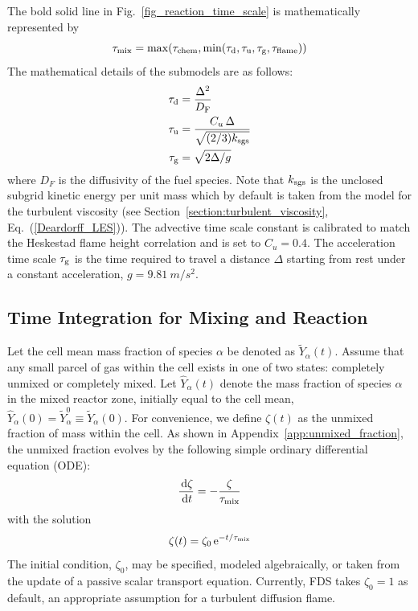 The bold solid line in Fig.~\ref{fig_reaction_time_scale} is mathematically represented by
\begin{equation}
\label{eqn_tau_mix}
\tau_{\rm mix} = \max(\tau_{\rm chem},\min(\tau_{\rm d},\tau_{\rm u},\tau_{\rm g},\tau_{\rm flame}))
\end{equation}
The mathematical details of the submodels are as follows:
\begin{align}
\label{eq:tau_diff} \tau_{\rm d} &= \frac{\Delta^2}{D_{\si{F}}} \\
\label{eq:tau_sgs}  \tau_{\rm u} &= \frac{C_u \,\Delta}{\sqrt{(2/3)k_{\rm sgs}}} \\
\label{eqn_tau_grav}\tau_{\rm g} &= \sqrt{ 2\Delta/g }
\end{align}
where $D_{\si{F}}$ is the diffusivity of the fuel species. Note that $k_{\rm sgs}$ is the unclosed subgrid kinetic energy per unit mass which by default is taken from the model for the turbulent viscosity (see Section~\ref{section:turbulent_viscosity}, Eq.~(\ref{Deardorff_LES})).  The advective time scale constant is calibrated to match the Heskestad flame height correlation \cite{FDS_Validation_Guide} and is set to $C_u = 0.4$. The acceleration time scale $\tau_{\rm g}$ is the time required to travel a distance $\Delta$ starting from rest under a constant acceleration, $g=\SI{9.81}{m/s^2}$.



\subsection{Time Integration for Mixing and Reaction}
\label{sec:subgrid_evironment}

Let the cell mean mass fraction of species $\alpha$ be denoted as $\widetilde{Y}_\alpha(t)$. Assume that any small parcel of gas within the cell exists in one of two states: completely unmixed or completely mixed.  Let $\hat{Y}_\alpha(t)$ denote the mass fraction of species $\alpha$ in the mixed reactor zone, initially equal to the cell mean, $\hat{Y}_\alpha(0) = \widetilde{Y}_{\alpha}^0 \equiv \widetilde{Y}_{\alpha}(0)$. For convenience, we define $\zeta(t)$ as the unmixed fraction of mass within the cell. As shown in Appendix~\ref{app:unmixed_fraction}, the unmixed fraction evolves by the following simple ordinary differential equation (ODE):
\begin{equation}
\label{eq:zeta}
\frac{\,\mathrm{d} \zeta}{\,\mathrm{d} t}=-\frac{\zeta}{\tau_{\rm mix}}
\end{equation}
with the solution
\begin{equation}
\label{eq:zeta_soln}
\zeta(t) = \zeta_0 \,{\rm e}^{-t/\tau_{\rm mix}}
\end{equation}
The initial condition, $\zeta_0$, may be specified, modeled algebraically, or taken from the update of a passive scalar transport equation.  Currently, FDS takes $\zeta_0=1$ as default, an appropriate assumption for a turbulent diffusion flame.

